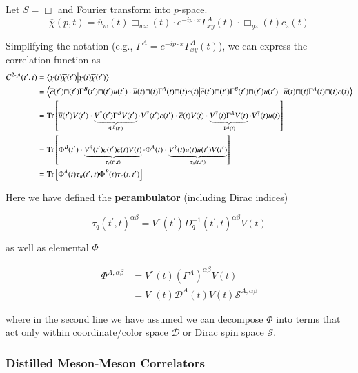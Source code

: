 Let \(S = \Box\) and Fourier transform into \(p\)-space. 
\[
\overline{\chi}(p, t) = \overline{u}_w(t) \Box_{wx}(t) \cdot e^{-ip\cdot x} \Gamma^A_{xy}(t) \cdot \Box_{yz}(t) c_z(t)
\]

Simplifying the notation (e.g., \(\Gamma^A = e^{-ip\cdot x} \Gamma^A_{xy}(t)\)), we can express the correlation function as 
\begin{align}
C^{2\text{-pt}}(t^\prime, t) &= \braket{\chi(t) \overline{\chi}(t^\prime)} \\
&= \braket{
\overline{c}(t^\prime) \Box(t^\prime) \Gamma^B(t^\prime) \Box(t^\prime) u(t^\prime) \cdot
\overline{u}(t) \Box(t) \Gamma^A(t) \Box(t) c(t)
} \\ 
&= \text{Tr}\left[
    \overline{u}(t^\prime) V(t^\prime) \cdot 
    \underbrace{V^\dagger(t^\prime) \Gamma^B V(t^\prime)}_{\Phi^B(t^\prime)} \cdot 
    V^\dagger(t^\prime) c(t^\prime) \cdot 
    \overline{c}(t) V(t) \cdot 
    \underbrace{V^\dagger(t) \Gamma^A V(t)}_{\Phi^A(t)} \cdot 
    V^\dagger(t) u(t)
\right] \\
&= \text{Tr} \left[\Phi^B(t^\prime) \cdot 
    \underbrace{V^\dagger(t^\prime) c(t^\prime) \overline{c}(t) V(t)}_{\tau_c(t^\prime, t)} \cdot 
    \Phi^A(t) \cdot 
    \underbrace{V^\dagger(t) u(t) \overline{u}(t^\prime) V(t^\prime)}_{\tau_u(t, t^\prime)}
\right] \\
&= \text{Tr}\left[\Phi^A(t) \tau_u(t^\prime, t) \Phi^B(t) \tau_c(t, t^\prime)\right]
\end{align}

Here we have defined the \textbf{perambulator} (including Dirac indices)

\begin{equation}
\tau_q(t^\prime, t)^{\alpha \beta} = V^\dagger(t^\prime) D^{-1}_q(t^\prime, t)^{\alpha \beta} V(t)
\end{equation}

as well as elemental $\Phi$
    
\begin{align}
\Phi^{A, \alpha\beta} 
&= V^\dagger(t) (\Gamma^A)^{\alpha \beta} V(t) \\
&= V^\dagger(t) \mathcal D^A(t)V(t) \mathcal S^{A, \alpha \beta}
\end{align}

where in the second line we have assumed we can decompose \(\Phi\) into terms that act only within coordinate/color space \(\mathcal{D}\) or Dirac spin space \(\mathcal{S}\).

\subsubsection{Distilled Meson-Meson Correlators}

